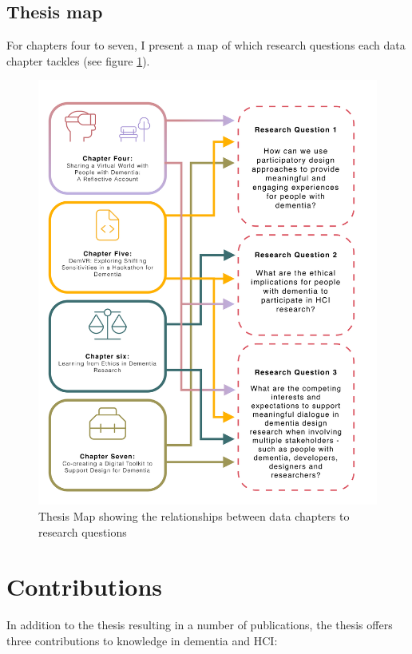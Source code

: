 \newpage
\subsection{Thesis map}
For chapters four to seven, I present a map of which research questions each data chapter tackles (see figure \ref{fig:RQ_and_Chapters}).

\label{Intro:Thesis Map}
\begin{figure}[htp]
\centering
\includegraphics[width=.8\linewidth]{Images/Thesis_Narrative/RQ_and_Chapters.png}
\caption{Thesis Map showing the relationships between data chapters to research questions}
\label{fig:RQ_and_Chapters}
\end{figure}


\section{Contributions}
\label{Intro:Contribution}
In addition to the thesis resulting in a number of publications, the thesis offers three contributions to knowledge in dementia and HCI:


